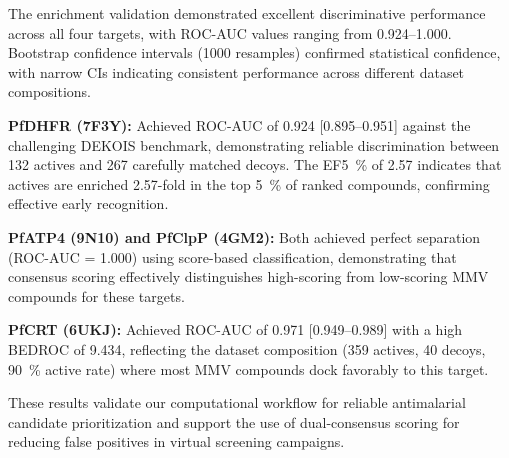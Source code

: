 \documentclass[journal=jcisd8,manuscript=suppinfo]{achemso}
\begin{document}
The enrichment validation demonstrated excellent discriminative performance across all four targets, with ROC-AUC values ranging from \numrange{0.924}{1.000}. Bootstrap confidence intervals (\num{1000} resamples) confirmed statistical confidence, with narrow CIs indicating consistent performance across different dataset compositions.

\textbf{PfDHFR (7F3Y):} Achieved ROC-AUC of \num{0.924} [\numrange{0.895}{0.951}] against the challenging DEKOIS benchmark, demonstrating reliable discrimination between \num{132} actives and \num{267} carefully matched decoys. The EF\qty{5}{\percent} of \num{2.57} indicates that actives are enriched \num{2.57}-fold in the top \qty{5}{\percent} of ranked compounds, confirming effective early recognition.

\textbf{PfATP4 (9N10) and PfClpP (4GM2):} Both achieved perfect separation (ROC-AUC = \num{1.000}) using score-based classification, demonstrating that consensus scoring effectively distinguishes high-scoring from low-scoring MMV compounds for these targets.

\textbf{PfCRT (6UKJ):} Achieved ROC-AUC of \num{0.971} [\numrange{0.949}{0.989}] with a high BEDROC of \num{9.434}, reflecting the dataset composition (\num{359} actives, \num{40} decoys, \qty{90}{\percent} active rate) where most MMV compounds dock favorably to this target.

These results validate our computational workflow for reliable antimalarial candidate prioritization and support the use of dual-consensus scoring for reducing false positives in virtual screening campaigns.


\end{document}

